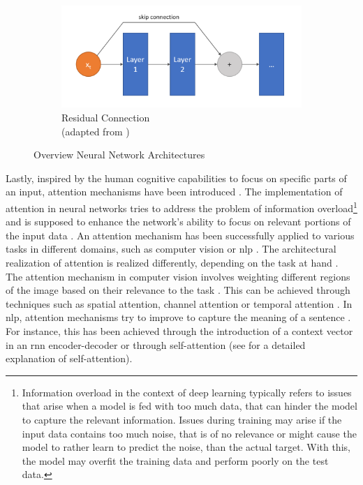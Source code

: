 \begin{figure}[H]
  \begin{subfigure}{0.6\textwidth}
    \centering
    \includegraphics[width=\linewidth]{images/resnet.png}
    \captionsetup{justification=centering}
    \caption{Residual Connection \\(adapted from \cite{hassan2019ResNet3450})} \label{fig:resnet}
  \end{subfigure}
\caption[Overview Neural Network Architectures]{Overview Neural Network Architectures} \label{fig:NN_architectures_Overview}
\end{figure}


Lastly, inspired by the human cognitive capabilities to focus on specific parts of an input, attention mechanisms have been introduced \cite{niu2021ReviewAttentionMechanism, aggarwal2018NeuralNetworksDeep}.
The implementation of attention in neural networks tries to address the problem of information overload\footnote{Information overload in the context of deep learning typically refers to issues that arise when a model is fed with too much data, that can hinder the model to capture the relevant information.
Issues during training may arise if the input data contains too much noise, that is of no relevance or might cause the model to rather learn to predict the noise, than the actual target.
With this, the model may overfit the training data and perform poorly on the test data.} and is supposed to enhance the network's ability to focus on relevant portions of the input data \cite{niu2021ReviewAttentionMechanism}.
An attention mechanism has been successfully applied to various tasks in different domains, such as computer vision or \gls{nlp} \cite{niu2021ReviewAttentionMechanism}.
The architectural realization of attention is realized differently, depending on the task at hand \cite{aggarwal2018NeuralNetworksDeep}.
The attention mechanism in computer vision involves weighting different regions of the image based on their relevance to the task \cite{aggarwal2018NeuralNetworksDeep}. 
This can be achieved through techniques such as spatial attention, channel attention or temporal attention \cite{guo2022AttentionMechanismsComputer}.
In \gls{nlp}, attention mechanisms try to improve to capture the meaning of a sentence \cite{niu2021ReviewAttentionMechanism}. 
For instance, this has been achieved through the introduction of a context vector in an \gls{rnn} encoder-decoder \cite{DBLP:journals/corr/BahdanauCB14} or through self-attention \cite{vaswani2017AttentionAllYou} (see  for a detailed explanation of self-attention).

